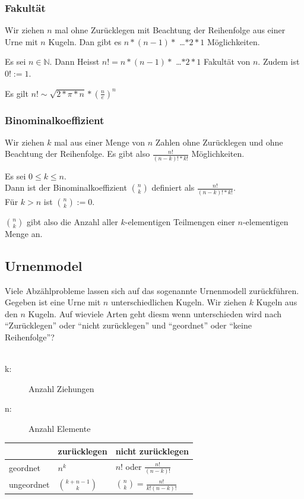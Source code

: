 \documentclass[10pt]{article}
\newtheorem[M]{definition}{Def.}
\newtheorem[M]{satz}{Satz}
\numberwithin{equation}{section}
\newcommand{\NN}{\mathbb{N}} %
\begin{document}
\subsubsection{Fakultät}
Wir ziehen $n$ mal ohne Zurücklegen mit Beachtung der Reihenfolge aus einer Urne mit $n$ Kugeln. Dan gibt es $n*(n-1)*$ \dots $*2*1$ Möglichkeiten.
\begin{definition}[Fakultät]
Es sei $n \in \NN$. Dann Heisst $n!=n*(n-1)*$ \dots $*2*1$ Fakultät von $n$. Zudem ist $0! := 1$. 
\end{definition}

Es gilt $n! \sim \sqrt{2*\pi*n}*(\frac{n}{e})^n$

\subsubsection{Binominalkoeffizient}
Wir ziehen $k$ mal aus einer Menge von $n$ Zahlen ohne Zurücklegen und ohne Beachtung der Reihenfolge. Es gibt also $\frac{n!}{(n-k)!*k!}$ Möglichkeiten.
\begin{definition}[Binominalkoeffizient]
Es sei $0 \leq k \leq n$. \\
Dann ist der Binominalkoeffizient $\binom{n}{k}$ definiert als $\frac{n!}{(n-k)!*k!}$. \\
Für $k > n$ ist $\binom{n}{k} := 0$.
\end{definition}
$\binom{n}{k}$ gibt also die Anzahl aller $k$-elementigen Teilmengen einer $n$-elementigen Menge an.

\subsection{Urnenmodel}
Viele Abzählprobleme lassen sich auf das sogenannte Urnenmodell zurückführen. Gegeben ist eine Urne mit $n$ unterschiedlichen Kugeln. Wir ziehen $k$ Kugeln aus den $n$ Kugeln. Auf wieviele Arten geht diesm wenn unterschieden wird nach "`Zurücklegen"' oder "`nicht zurücklegen"' und "`geordnet"' oder "`keine Reihenfolge"'? \\
\\
\begin{description}
	\item[k:] Anzahl Ziehungen
	\item[n:] Anzahl Elemente
\end{description}
\begin{tabular}{l|l|l}
 &zur\"{u}cklegen&nicht zur\"{u}cklegen\\\hline
 geordnet&$n^k$&$n!$ oder $\frac{n!}{(n-k)!}$\\\hline
 ungeordnet&$\binom{k+n-1}{k}$&$\binom{n}{k}=\frac{n!}{k!(n-k)!}$
\end{tabular}\\
\end{document}
